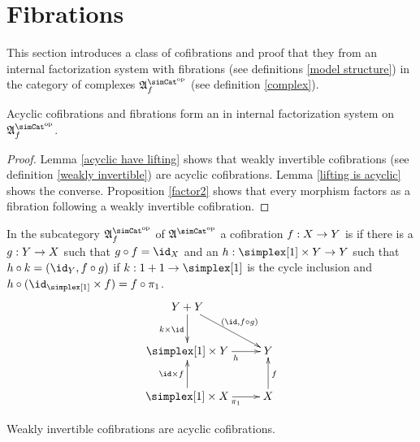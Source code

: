 \documentclass[csh.tex]{subfiles}
\begin{document}
\section{Fibrations}
This section introduces a class of cofibrations and proof that they from an internal factorization system with fibrations (see definitions \ref{model structure}) in the category of complexes $\ambient\s\f$ (see definition \ref{complex}).

\begin{lemma} Acyclic cofibrations and fibrations form an in internal factorization system on $\ambient\s\f$. \label{factorization system 2} \end{lemma}

\begin{proof} Lemma \ref{acyclic have lifting} shows that weakly invertible cofibrations (see definition \ref{weakly invertible}) are acyclic cofibrations. Lemma \ref{lifting is acyclic} shows the converse. Proposition \ref{factor2} shows that every morphism factors as a fibration following a weakly invertible cofibration. 
\end{proof}

\begin{definition} In the subcategory $\ambient\s\f$ of $\ambient\s$ a cofibration $f: X\to Y$ is  if there is a $g: Y\to X$ such that $g\circ f = \id_X$ and an $h\of \simplex[1]\times Y\to Y$ such that $h\circ k = (\id_Y,f\circ g)$ if $k\of 1+1\to\simplex[1]$ is the cycle inclusion and 
$h\circ (\id_{\simplex[1]}\times f) = f\circ\pi_1$.
\[\xymatrix{
Y+Y\ar[d]_{k\times \id} \ar[dr]^{(\id,f\circ g)}\\
\simplex[1]\times Y \ar[r]_(.6)h & Y\\
\simplex[1]\times X \ar[r]_(.6){\pi_1}\ar[u]^{\id\times f} & X\ar[u]_f\\
}\]
\end{definition}

\begin{lemma} Weakly invertible cofibrations are acyclic cofibrations. \label{acyclic have lifting}\end{lemma}
\end{document}
